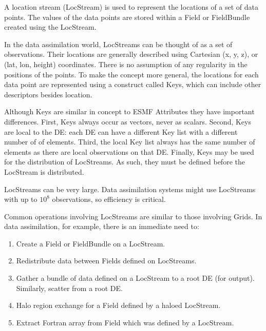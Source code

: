 %

A location stream (LocStream) is used to represent the locations of
a set of data points.  The values of the data points are stored within
a Field or FieldBundle created using the LocStream.

In the data assimilation world, LocStreams can
be thought of as a set of observations.  Their locations are generally
described using Cartesian (x, y, z), or (lat, lon, height) coordinates.
There is no assumption of any regularity in the positions of the points.
To make the concept more general, the locations for each data point are
represented using a construct called Keys, which can include other
descriptors besides location.

Although Keys are similar in concept to ESMF Attributes they have important
differences. First, Keys always occur as vectors, never as scalars.
Second, Keys are local to the DE: each DE can have a different Key
list with a different number of of elements. Third, the local Key 
list always has the same number of elements as there are local observations
on that DE.  Finally, Keys may be used for the distribution of LocStreams.
As such, they must be defined before the LocStream is distributed.

LocStreams can be very large. Data assimilation systems might use
LocStreams with up to $10^{8}$ observations, so efficiency is critical.

Common operations involving LocStreams are similar to those involving Grids.
In data assimilation, for example, there is an immediate need to:

\begin{enumerate}
\item Create a Field or FieldBundle on a LocStream.
\item Redistribute data between Fields defined on LocStreams.
\item Gather a bundle of data defined on a LocStream to a root
DE (for output). Similarly, scatter from a root DE.
\item Halo region exchange for a Field defined by a haloed LocStream.
\item Extract Fortran array from Field which was defined by a LocStream.
\end{enumerate}

